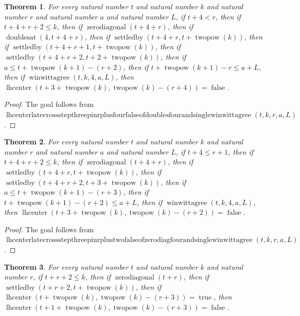 \documentclass[11pt]{article}
\newtheorem{theorem}{Theorem}[section]
\theoremstyle{definition}
\begin{document}
\begin{theorem}
\label{ll:paper:lhcenter-late-cross-step-three-pin-r-plus-four-false-of-doubles-four-and-single-winwittagree}
For every natural number \(t\) and natural number \(k\) and natural number \(r\) and natural number \(a\) and natural number \(L\), if \(t + 4 < r\), then if \(t + 4 + r + 2 \le k\), then if \(\operatorname{zerodiagonal}(t + 4 + r)\), then if \(\operatorname{doublesat}(4, t + 4 + r)\), then if \(\operatorname{settledby}(t + 4 + r, t + \operatorname{twopow}(k))\), then if \(\operatorname{settledby}(t + 4 + r + 1, t + \operatorname{twopow}(k))\), then if \(\operatorname{settledby}(t + 4 + r + 2, t + 2 + \operatorname{twopow}(k))\), then if \(a \le t + \operatorname{twopow}(k + 1) - (r + 2)\), then if \(t + \operatorname{twopow}(k + 1) - r \le a + L\), then if \(\operatorname{winwittagree}(t, k, 4, a, L)\), then \(\operatorname{lhcenter}(t + 3 + \operatorname{twopow}(k), \operatorname{twopow}(k) - (r + 4)) = \operatorname{false}\).
\end{theorem}
\begin{proof}
The goal follows from \(\operatorname{lhcenterlatecrossstepthreepinrplusfourfalseofdoublesfourandsinglewinwittagree}(t, k, r, a, L)\).
\end{proof}
\begin{theorem}
\label{ll:paper:lhcenter-late-cross-step-three-pin-r-plus-two-false-of-zero-diag-four-and-single-winwittagree}
For every natural number \(t\) and natural number \(k\) and natural number \(r\) and natural number \(a\) and natural number \(L\), if \(t + 4 \le r + 1\), then if \(t + 4 + r + 2 \le k\), then if \(\operatorname{zerodiagonal}(t + 4 + r)\), then if \(\operatorname{settledby}(t + 4 + r, t + \operatorname{twopow}(k))\), then if \(\operatorname{settledby}(t + 4 + r + 2, t + 3 + \operatorname{twopow}(k))\), then if \(a \le t + \operatorname{twopow}(k + 1) - (r + 3)\), then if \(t + \operatorname{twopow}(k + 1) - (r + 2) \le a + L\), then if \(\operatorname{winwittagree}(t, k, 4, a, L)\), then \(\operatorname{lhcenter}(t + 3 + \operatorname{twopow}(k), \operatorname{twopow}(k) - (r + 2)) = \operatorname{false}\).
\end{theorem}
\begin{proof}
The goal follows from \(\operatorname{lhcenterlatecrossstepthreepinrplustwofalseofzerodiagfourandsinglewinwittagree}(t, k, r, a, L)\).
\end{proof}
\begin{theorem}
\label{ll:paper:lhcenter-late-cross-step-absorb-false-after-zero-diag}
For every natural number \(t\) and natural number \(k\) and natural number \(r\), if \(t + r + 2 \le k\), then if \(\operatorname{zerodiagonal}(t + r)\), then if \(\operatorname{settledby}(t + r + 2, t + \operatorname{twopow}(k))\), then if \(\operatorname{lhcenter}(t + \operatorname{twopow}(k), \operatorname{twopow}(k) - (r + 3)) = \operatorname{true}\), then \(\operatorname{lhcenter}(t + 1 + \operatorname{twopow}(k), \operatorname{twopow}(k) - (r + 3)) = \operatorname{false}\).
\end{theorem}
\end{document}
